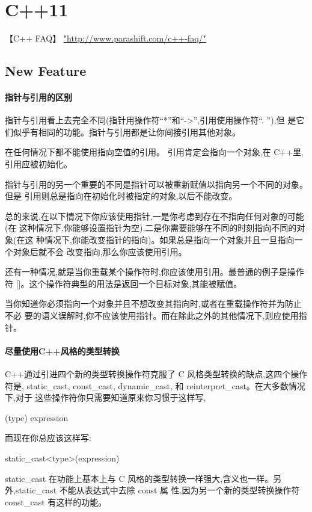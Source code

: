 \chapter{C++11}
【C++ FAQ】 \hyperref[C++ FAQ]{"http://www.parashift.com/c++-faq/"}


\section{New Feature}
\subsubsection{指针与引用的区别}
指针与引用看上去完全不同(指针用操作符“*”和“->”,引用使用操作符“. ”),但 是它们似乎有相同的功能。指针与引用都是让你间接引用其他对象。

在任何情况下都不能使用指向空值的引用。 引用肯定会指向一个对象,在 C++里,引用应被初始化。

指针与引用的另一个重要的不同是指针可以被重新赋值以指向另一个不同的对象。但是 引用则总是指向在初始化时被指定的对象,以后不能改变。

总的来说,在以下情况下你应该使用指针,一是你考虑到存在不指向任何对象的可能(在 这种情况下,你能够设置指针为空),二是你需要能够在不同的时刻指向不同的对象(在这 种情况下,你能改变指针的指向)。如果总是指向一个对象并且一旦指向一个对象后就不会 改变指向,那么你应该使用引用。

还有一种情况,就是当你重载某个操作符时,你应该使用引用。最普通的例子是操作符 []。这个操作符典型的用法是返回一个目标对象,其能被赋值。

当你知道你必须指向一个对象并且不想改变其指向时,或者在重载操作符并为防止不必 要的语义误解时,你不应该使用指针。而在除此之外的其他情况下,则应使用指针。

\subsubsection{尽量使用C++风格的类型转换}
C++通过引进四个新的类型转换操作符克服了 C 风格类型转换的缺点,这四个操作符是, static_cast, const_cast, dynamic_cast, 和 reinterpret_cast。在大多数情况下,对于 这些操作符你只需要知道原来你习惯于这样写,

(type) expression 

而现在你总应该这样写: 

static_cast<type>(expression)

static_cast 在功能上基本上与 C 风格的类型转换一样强大,含义也一样。另外,static_cast 不能从表达式中去除 const 属 性,因为另一个新的类型转换操作符 const_cast 有这样的功能。

